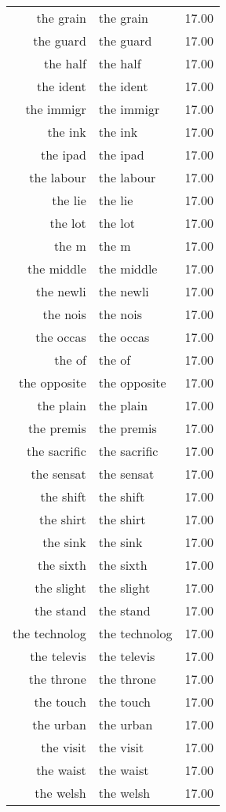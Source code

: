 \begin{table}[ht]
\begin{tabular}{rlr}
  the grain & the grain & 17.00 \\ 
  the guard & the guard & 17.00 \\ 
  the half & the half & 17.00 \\ 
  the ident & the ident & 17.00 \\ 
  the immigr & the immigr & 17.00 \\ 
  the ink & the ink & 17.00 \\ 
  the ipad & the ipad & 17.00 \\ 
  the labour & the labour & 17.00 \\ 
  the lie & the lie & 17.00 \\ 
  the lot & the lot & 17.00 \\ 
  the m & the m & 17.00 \\ 
  the middle & the middle & 17.00 \\ 
  the newli & the newli & 17.00 \\ 
  the nois & the nois & 17.00 \\ 
  the occas & the occas & 17.00 \\ 
  the of & the of & 17.00 \\ 
  the opposite & the opposite & 17.00 \\ 
  the plain & the plain & 17.00 \\ 
  the premis & the premis & 17.00 \\ 
  the sacrific & the sacrific & 17.00 \\ 
  the sensat & the sensat & 17.00 \\ 
  the shift & the shift & 17.00 \\ 
  the shirt & the shirt & 17.00 \\ 
  the sink & the sink & 17.00 \\ 
  the sixth & the sixth & 17.00 \\ 
  the slight & the slight & 17.00 \\ 
  the stand & the stand & 17.00 \\ 
  the technolog & the technolog & 17.00 \\ 
  the televis & the televis & 17.00 \\ 
  the throne & the throne & 17.00 \\ 
  the touch & the touch & 17.00 \\ 
  the urban & the urban & 17.00 \\ 
  the visit & the visit & 17.00 \\ 
  the waist & the waist & 17.00 \\ 
  the welsh & the welsh & 17.00 \\ 

\end{tabular}
\end{table}
